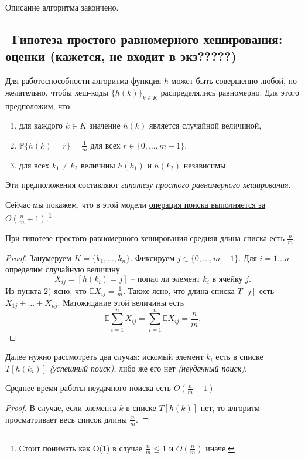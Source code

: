 Описание алгоритма закончено.

\subsection{\heart~Гипотеза простого равномерного хеширования: оценки (кажется, не входит в экз?????)}

Для работоспособности алгоритма функция $h$ может быть совершенно любой, но желательно, чтобы хеш-коды $\{h(k)\}_{k\in K}$ распределялись равномерно. Для этого предположим, что:
\begin{enumerate}
    \item для каждого $k \in K$ значение $h(k)$ является случайной величиной,
    \item $\mathbb P\{h(k) = r\} = \frac{1}{m}$ для всех $r \in \{0, \ldots, m-1\}$,
    \item для всех $k_1 \neq k_2$ величины $h(k_1)$ и $h(k_2)$ независимы.
\end{enumerate}
Эти предположения составляют \textit{гипотезу простого равномерного хеширования}.

Сейчас мы покажем, что в этой модели \underline{операция поиска выполняется за $O\left(\frac{n}{m}+1\right)$.}\footnote{Стоит понимать как O(1) в случае $\frac{n}{m} \leq 1$ и $O\left(\frac{n}{m}\right)$ иначе.}

\begin{theorem*}
	При гипотезе простого равномерного хеширования средняя длина списка есть $\frac{n}{m}$.
\end{theorem*}
\begin{proof}
Занумеруем $K = \{k_1, \ldots, k_n\}$. Фиксируем $j \in \{0, \ldots, m-1\}$. Для $i=1\ldots n$ определим случайную величину
$$X_{ij} = [h(k_i)=j] \text{~-- попал ли элемент $k_i$ в ячейку $j$.}$$
Из пункта 2) ясно, что $\mathbb E X_{ij} = \frac{1}{m}$. Также ясно, что длина списка $T[j]$ есть $X_{1j}+\ldots+X_{nj}$. Матожидание этой величины есть $$\mathbb E \sum_{i=1}^n X_{ij} = \sum_{i=1}^n \mathbb E X_{ij} = \frac{n}{m}.$$
\end{proof}

Далее нужно рассмотреть два случая: искомый элемент $k_i$ есть в списке $T[h(k_i)]$ \textit{(успешный поиск)}, либо же его нет \textit{(неудачный поиск)}.

\begin{theorem*}
	Среднее время работы неудачного поиска есть $O\left(\frac{n}{m}+1\right)$
\end{theorem*}
\begin{proof}
В случае, если элемента $k$ в списке $T[h(k)]$ нет, то алгоритм просматривает весь список длины $\frac{n}{m}$.
\end{proof}

